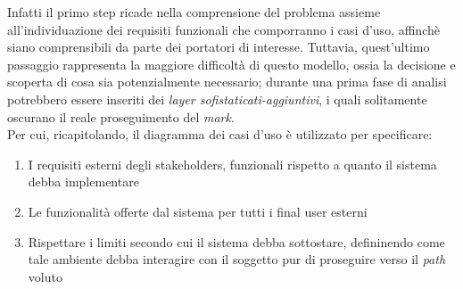 \documentclass{article}
\begin{document}
Infatti il primo step ricade nella comprensione del problema assieme all'individuazione dei requisiti funzionali che comporranno i casi d'uso, affinchè siano comprensibili da parte dei portatori di interesse. Tuttavia, quest'ultimo passaggio rappresenta la maggiore difficoltà di questo modello, ossia la decisione e scoperta di cosa sia potenzialmente necessario; durante una prima fase di analisi potrebbero essere inseriti dei \textit{layer sofistaticati-aggiuntivi}, i quali solitamente oscurano il reale proseguimento del \textit{mark}.\vspace*{14pt}\\
Per cui, ricapitolando, il diagramma dei casi d'uso è utilizzato per specificare:
\begin{enumerate}
    \renewcommand{\labelenumi}{-}
    \itemsep0em
    \item I requisiti esterni degli stakeholders, funzionali rispetto a quanto il sistema debba implementare
    \item Le funzionalità offerte dal sistema per tutti i final user esterni
    \item Rispettare i limiti secondo cui il sistema debba sottostare, defininendo come tale ambiente debba interagire con il soggetto pur di proseguire verso il \textit{path} voluto
\end{enumerate}
\end{document}
